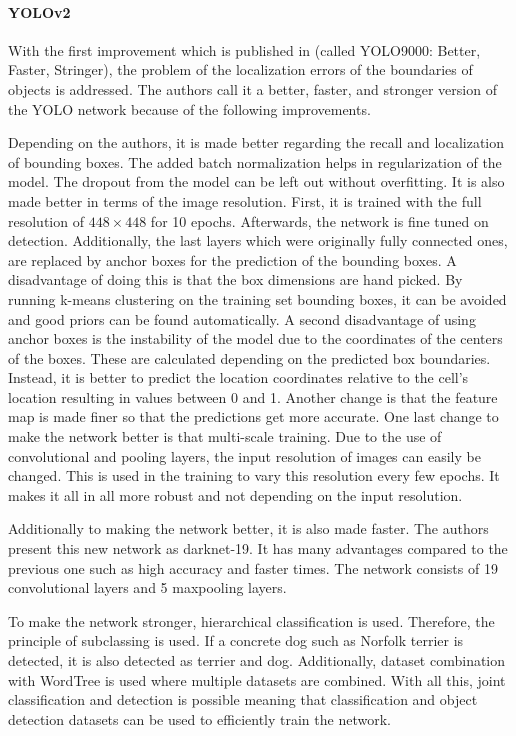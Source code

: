 \paragraph{YOLOv2}
With the first improvement which is published in \cite{yolov2} (called YOLO9000: Better, Faster, Stringer), the problem of the localization errors of the boundaries of objects is addressed. The authors call it a better, faster, and stronger version of the YOLO network because of the following improvements.

Depending on the authors, it is made better regarding the recall and localization of bounding boxes. The added batch normalization helps in regularization of the model. The dropout from the model can be left out without overfitting. It is also made better in terms of the image resolution. First, it is trained with the full resolution of $ 448 \times 448 $ for 10 epochs. Afterwards, the network is fine tuned on detection. Additionally, the last layers which were originally fully connected ones, are replaced by anchor boxes for the prediction of the bounding boxes. A disadvantage of doing this is that the box dimensions are hand picked. By running k-means clustering on the training set bounding boxes, it can be avoided and good priors can be found automatically. A second disadvantage of using anchor boxes is the instability of the model due to the coordinates of the centers of the boxes. These are calculated depending on the predicted box boundaries. Instead, it is better to predict the location coordinates relative to the cell's location resulting in values between 0 and 1. Another change is that the feature map is made finer so that the predictions get more accurate. One last change to make the network better is that multi-scale training. Due to the use of convolutional and pooling layers, the input resolution of images can easily be changed. This is used in the training to vary this resolution every few epochs. It makes it all in all more robust and not depending on the input resolution.

Additionally to making the network better, it is also made faster. The authors present this new network as darknet-19. It has many advantages compared to the previous one such as high accuracy and faster times. The network consists of 19 convolutional layers and 5 maxpooling layers.

To make the network stronger, hierarchical classification is used. Therefore, the principle of subclassing is used. If a concrete dog such as Norfolk terrier is detected, it is also detected as terrier and dog. Additionally, dataset combination with WordTree is used where multiple datasets are combined. With all this, joint classification and detection is possible meaning that classification and object detection datasets can be used to efficiently train the network.

